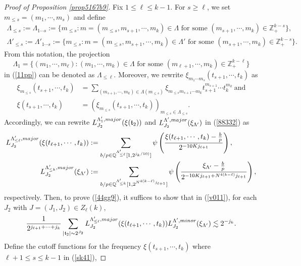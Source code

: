 \documentclass[10pt,a4paper]{amsart}
\numberwithin{equation}{section}
\begin{document}
\begin{proof}[Proof of Proposition \ref{prop5167b9}]
Fix $1\le \ell \le  k-1$. For $s\ge \ell$, we set $m_{\le s}=(m_1,\cdots,m_s)$ and define
\begin{align*}
	 \Lambda_{\le s}:=\Lambda_{1\cdots s}:=\{m_{\le s}:m=(m_{\le s}, m_{s+1},\cdots,m_k)\in \Lambda \text{ for some } (m_{s+1},\cdots,m_k)\in\mathbb{Z}_{+}^{k-s}\},\\
	 \Lambda'_{\le s}:=\Lambda'_{1\cdots s}:=\{m_{\le s}:m=(m_{\le s}, m_{s+1},\cdots,m_k)\in \Lambda' \text{ for some } (m_{s+1},\cdots,m_k)\in\mathbb{Z}_{+}^{k-s}\}.
\end{align*}
From this notation,  the projection $$\Lambda_{1}=\{(m_1,\cdots,m_\ell):(m_1,\cdots,m_k)\in \Lambda \text{ for some } (m_{\ell+1},\cdots,m_k)\in\mathbb{Z}_{+}^{k-\ell}\}$$ in (\ref{11pp}) can  be denoted as $\Lambda_{\le \ell}$. 
Moreover,  we rewrite $\xi_{m_1\cdots m_s}(t_{s+1},\cdots, t_k)$ as
\begin{align}
\xi_{m_{\le s}}(t_{s+1},\cdots,t_k)&=\sum_{(m_{s+1},\cdots,m_k)\in \Lambda(m_{\le s})} \xi_{m_{\le s} m_{s+1}\cdots m_k} t_{s+1}^{m_{s+1}}\cdots t_k^{m_k}\ \text{and}\nonumber\\
  \xi(t_{s+1},\cdots,t_k)&=(\xi_{m_{\le s} }(t_{s+1},\cdots, t_k))_{m_{\le s}\in \Lambda_{\le s}}.\label{sk41}
\end{align}
Accordingly, we can rewrite $L^{\Lambda_{1}',\rm{major}}_{J_2}(\xi(\mathfrak{t}_2) )$ and $L^{\Lambda',\rm{major}}_{J_2}(\xi_{\Lambda'})$ in (\ref{88332}) as
\begin{align*}
 L^{\Lambda_{\le \ell}',\rm{major}}_{J_2}(\xi(t_{\ell+1},\cdots,t_k) )&:=\sum_{b/p\in \mathbb{Q}^{\Lambda'_{\le \ell}}[1,2^{j_{k}/10)} ]}\psi\left(\frac{\xi(t_{\ell+1},\cdots,t_k)-\frac{b}{p}}{ 2^{-10Kj_{\ell+1} } }\right),\nonumber \\
 L^{\Lambda_{\le k}',\rm{major}}_{J_2}(\xi_{\Lambda'} )&:=\sum_{b/p\in \mathbb{Q}^{\Lambda'_{\le k}}[1,2^{N^{4(k-\ell)}j_{\ell+1}} ]}\psi\left(\frac{\xi_{\Lambda'}-\frac{b}{p}}{ 2^{-10Kj_{\ell+1} +N^{4 (k-\ell)}j_{\ell+1}} }\right),
\end{align*}
respectively.
Then, to prove (\ref{44gg9}),  it suffices to show that  in (\ref{v011}), for  each $J_2$ with $J=(J_1,J_2)\in Z_{\ell}(k)$,
\begin{align} \label{rara}
  \frac{1}{2^{j_{\ell+1}+\cdots+j_k}}  \sum_{|\mathfrak{t}_{2}|\sim 2^{J_2}}  
L^{\Lambda_{\le \ell}',\rm{major}}_{J_2}(\xi(t_{\ell+1},\cdots,t_k) )L^{\Lambda',\rm{minor}}_{J_2}(\xi_{\Lambda'})\lesssim 2^{- j_{k}}.
\end{align} 
Define the cutoff functions  for the frequency  $\xi(t_{s+1},\cdots,t_k)$ where $\ell+1\le  s\le k-1$ in (\ref{sk41}),

\end{proof}
\end{document}
